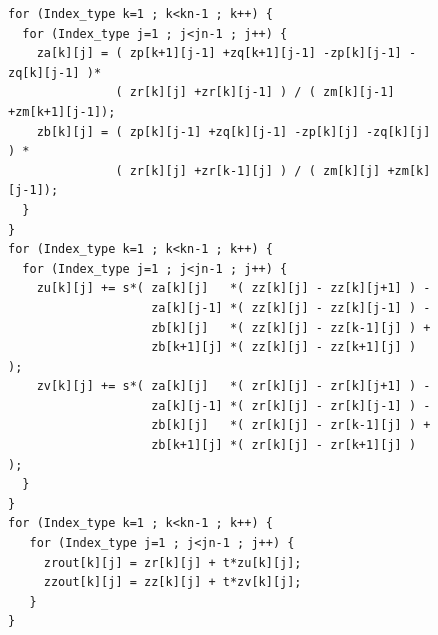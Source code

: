 \documentclass{article}
\begin{document}
\begin{figure}
\begin{lstlisting}[caption={C++ implementation of the \texttt{HYDRO\_2D} benchmark},label={HydroCpp}]
for (Index_type k=1 ; k<kn-1 ; k++) {
  for (Index_type j=1 ; j<jn-1 ; j++) {
    za[k][j] = ( zp[k+1][j-1] +zq[k+1][j-1] -zp[k][j-1] -zq[k][j-1] )*
               ( zr[k][j] +zr[k][j-1] ) / ( zm[k][j-1] +zm[k+1][j-1]);
    zb[k][j] = ( zp[k][j-1] +zq[k][j-1] -zp[k][j] -zq[k][j] ) *
               ( zr[k][j] +zr[k-1][j] ) / ( zm[k][j] +zm[k][j-1]);
  }
}
for (Index_type k=1 ; k<kn-1 ; k++) {
  for (Index_type j=1 ; j<jn-1 ; j++) {
    zu[k][j] += s*( za[k][j]   *( zz[k][j] - zz[k][j+1] ) -
                    za[k][j-1] *( zz[k][j] - zz[k][j-1] ) -
                    zb[k][j]   *( zz[k][j] - zz[k-1][j] ) +
                    zb[k+1][j] *( zz[k][j] - zz[k+1][j] ) );
    zv[k][j] += s*( za[k][j]   *( zr[k][j] - zr[k][j+1] ) -
                    za[k][j-1] *( zr[k][j] - zr[k][j-1] ) -
                    zb[k][j]   *( zr[k][j] - zr[k-1][j] ) +
                    zb[k+1][j] *( zr[k][j] - zr[k+1][j] ) );
  }
}
for (Index_type k=1 ; k<kn-1 ; k++) {
   for (Index_type j=1 ; j<jn-1 ; j++) {
     zrout[k][j] = zr[k][j] + t*zu[k][j];
     zzout[k][j] = zz[k][j] + t*zv[k][j];
   }
}   
\end{lstlisting}
\end{figure}
\end{document}

